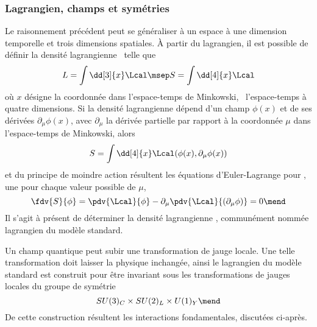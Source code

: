 \subsubsection{Lagrangien, champs et symétries}\label{chapter-MS-MSSM-section-formalisme-subsec-into_lagrangien-subsubsec-lagrangien_champs_symetries}
Le raisonnement précédent peut se généraliser à un espace à une dimension temporelle et trois dimensions spatiales.
À partir du lagrangien, il est possible de définir la densité lagrangienne \Lcal\ telle que
\begin{equation}
L = \int\dd[3]{x}\Lcal
\msep
S = \int\dd[4]{x}\Lcal
\end{equation}
où $x$ désigne la coordonnée dans l'espace-temps de Minkowski, \ie\ l'espace-temps à quatre dimensions.
Si la densité lagrangienne dépend d'un champ $\phi(x)$ et de ses dérivées $\partial_\mu\phi(x)$,
avec $\partial_\mu$ la dérivée partielle par rapport à la coordonnée $\mu$ dans l'espace-temps de Minkowski,
alors
\begin{equation}
S = \int\dd[4]{x}\Lcal(\phi(x),\partial_\mu\phi(x))
\end{equation}
et du principe de moindre action résultent les équations d'Euler-Lagrange pour \Lcal,
une pour chaque valeur possible de $\mu$,
\begin{equation}
\fdv{S}{\phi}
=
\pdv{\Lcal}{\phi} - \partial_\mu\pdv{\Lcal}{(\partial_\mu\phi)} = 0
\mend
\end{equation}
Il s'agit à présent de déterminer la densité lagrangienne \Lcal, communément nommée lagrangien du modèle standard.
\par Un champ quantique peut subir une transformation de jauge locale. Une telle transformation doit laisser la physique inchangée, ainsi le lagrangien du modèle standard est construit pour être invariant sous les transformations de jauges locales du groupe de symétrie
\begin{equation}
SU(3)_C \times SU(2)_L \times U(1)_Y
\mend
\label{eq-symmetries_lagrangien_SM}
\end{equation}
De cette construction résultent les interactions fondamentales, discutées ci-après.







